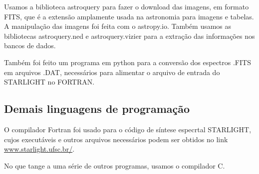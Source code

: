 Usamos a biblioteca astroquery para fazer o download das imagens,
em formato FITS, que é a extensão amplamente usada na astronomia para imagens e tabelas. A manipulação das imagens foi feita com o astropy.io. Também usamos as bibliotecas astroquery.ned e astroquery.vizier para a extração das informações nos bancos de dados.

Também foi feito um programa em python para a conversão dos espectros .FITS em arquivos .DAT, necessários para alimentar o arquivo de entrada do STARLIGHT no FORTRAN.

\subsection{Demais linguagens de programação}

O compilador Fortran foi usado para o código de síntese especrtal STARLIGHT, cujos executáveis e outros arquivos necessários podem ser obtidos no link \url{www.starlight.ufsc.br/}.

No que tange a uma série de outros programas, usamos o compilador C.